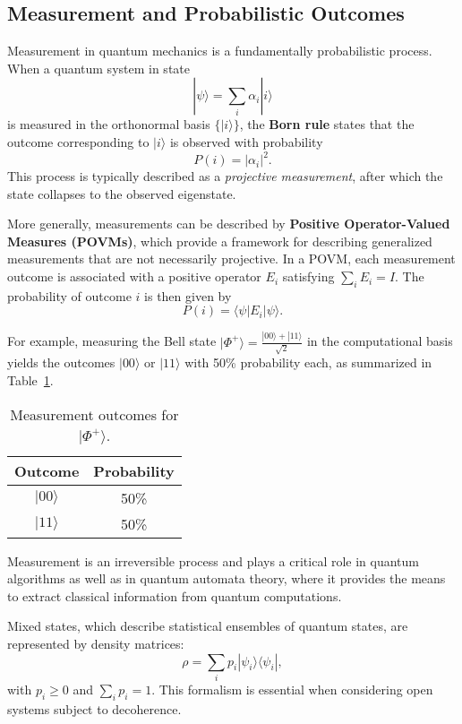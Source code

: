 
\subsection{Measurement and Probabilistic Outcomes}
\label{subsec:measurement}

Measurement in quantum mechanics is a fundamentally probabilistic process. When a quantum system in state
\[
|\psi\rangle = \sum_i \alpha_i|i\rangle
\]
is measured in the orthonormal basis \(\{|i\rangle\}\), the \textbf{Born rule} states that the outcome corresponding to \(|i\rangle\) is observed with probability
\[
P(i) = |\alpha_i|^2.
\]
This process is typically described as a \emph{projective measurement}, after which the state collapses to the observed eigenstate.

More generally, measurements can be described by \textbf{Positive Operator-Valued Measures (POVMs)}, which provide a framework for describing generalized measurements that are not necessarily projective. In a POVM, each measurement outcome is associated with a positive operator \(E_i\) satisfying \(\sum_i E_i = I\). The probability of outcome \(i\) is then given by
\[
P(i) = \langle\psi| E_i |\psi\rangle.
\]

For example, measuring the Bell state \( |\Phi^+\rangle = \frac{|00\rangle + |11\rangle}{\sqrt{2}} \) in the computational basis yields the outcomes \( |00\rangle \) or \( |11\rangle \) with 50\% probability each, as summarized in Table~\ref{tab:bell_measurement}.

\begin{table}[h]
\centering
\caption{Measurement outcomes for \( |\Phi^+\rangle \).}
\label{tab:bell_measurement}
\begin{tabular}{|c|c|}
\hline
\textbf{Outcome} & \textbf{Probability} \\ \hline
\( |00\rangle \)      & 50\%                \\ \hline
\( |11\rangle \)      & 50\%                \\ \hline
\end{tabular}
\end{table}

Measurement is an irreversible process and plays a critical role in quantum algorithms as well as in quantum automata theory, where it provides the means to extract classical information from quantum computations.

Mixed states, which describe statistical ensembles of quantum states, are represented by density matrices:
\[
\rho = \sum_i p_i |\psi_i\rangle\langle\psi_i|,
\]
with \(p_i \ge 0\) and \(\sum_i p_i = 1\). This formalism is essential when considering open systems subject to decoherence.

